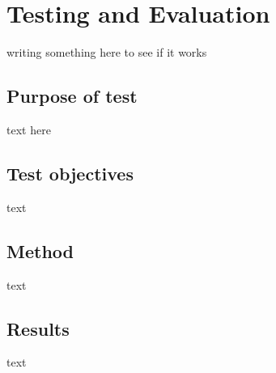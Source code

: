 \chapter{Testing and Evaluation}\label{ch:testeval}
writing something here to see if it works

\section{Purpose of test}
text here

\section{Test objectives}
text

\section{Method}
text

\section{Results}
text